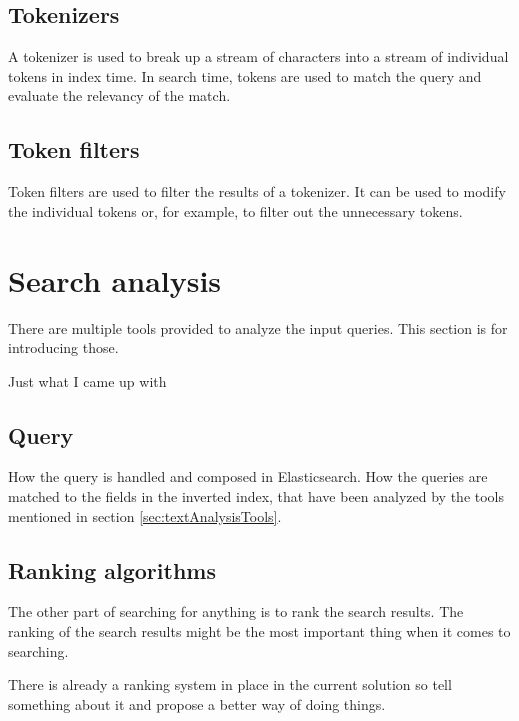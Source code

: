 \subsection{Tokenizers}
A tokenizer is used to break up a stream of characters into a stream of individual tokens in index time. 
In search time, tokens are used to match the query and evaluate the relevancy of the match.
\cite{elasticIntro}


\subsection{Token filters}
Token filters are used to filter the results of a tokenizer. 
It can be used to modify the individual tokens or, for example, to filter out the unnecessary tokens.
\cite{elasticIntro}



\section{Search analysis}

There are multiple tools provided to analyze the input queries. This section is for introducing those.
\cite{relevantSearch}

 Just what I came up with 

\subsection{Query}
How the query is handled and composed in Elasticsearch. 
How the queries are matched to the fields in the inverted index, that have been analyzed by the tools mentioned in section \ref{sec:textAnalysisTools}.

\subsection{Ranking algorithms}
The other part of searching for anything is to rank the search results.
The ranking of the search results might be the most important thing when it comes to searching.

\todo{}
There is already a ranking system in place in the current solution so tell something about it and propose a better way of doing things.


